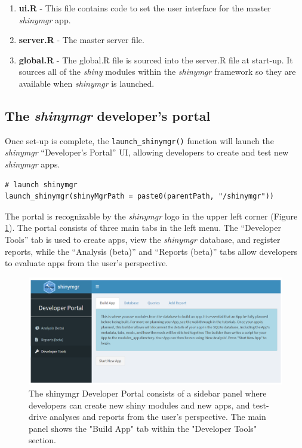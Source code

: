 \begin{itemize}
  \begin{enumerate}
  \def\labelenumi{\arabic{enumi}.}
  \tightlist
  \item
    \textbf{ui.R} - This file contains code to set the user interface for the master \emph{shinymgr} app.\\
  \item
    \textbf{server.R} - The master server file.\\
  \item
    \textbf{global.R} - The global.R file is sourced into the server.R file at start-up. It sources all of the \emph{shiny} modules within the \emph{shinymgr} framework so they are available when \emph{shinymgr} is launched.
  \end{enumerate}
\end{itemize}

\subsection{\texorpdfstring{The \emph{shinymgr} developer's portal}{The shinymgr developer's portal}}\label{the-shinymgr-developers-portal}

Once set-up is complete, the \texttt{launch\_shinymgr()} function will launch the \emph{shinymgr} ``Developer's Portal'' UI, allowing developers to create and test new \emph{shinymgr} apps.

\begin{verbatim}
# launch shinymgr
launch_shinymgr(shinyMgrPath = paste0(parentPath, "/shinymgr"))
\end{verbatim}

The portal is recognizable by the \emph{shinymgr} logo in the upper left corner (Figure \ref{fig:fig3}). The portal consists of three main tabs in the left menu. The ``Developer Tools'' tab is used to create apps, view the \emph{shinymgr} database, and register reports, while the ``Analysis (beta)'' and ``Reports (beta)'' tabs allow developers to evaluate apps from the user's perspective.

\begin{figure}
\includegraphics[width=1\linewidth]{images/figure3} \caption{The shinymgr Developer Portal consists of a sidebar panel where developers can create new shiny modules and new apps, and test-drive analyses and reports from the user's perspective. The main panel shows the "Build App" tab within the "Developer Tools" section.}\label{fig:fig3}
\end{figure}

